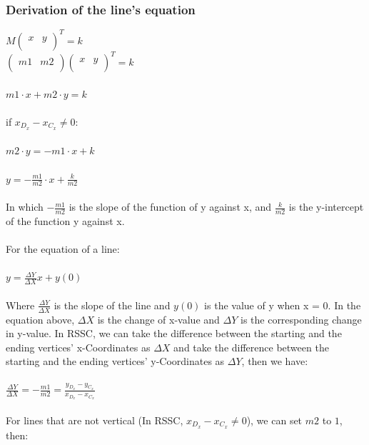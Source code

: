 \documentclass[12pt]{article}
\begin{document}
\subsubsection*{Derivation of the line's equation}
$M \begin{pmatrix}
  x & y \\
\end{pmatrix}^T = k$\\
$\begin{pmatrix}
  m1 & m2 \\
\end{pmatrix}
\begin{pmatrix}
  x & y \\
\end{pmatrix}^T = k$\\
\\
$m1 \cdot x + m2 \cdot y = k$\\
\\
if $ x_{D_x}-x_{C_x}\neq{0}$: \\
\\
\indent
$m2\cdot y = -m1\cdot x + k$\\
\\
\indent
$y = -\frac{m1}{m2}\cdot x + \frac{k}{m2}$\\
\\
In which $-\frac{m1}{m2}$ is the slope of the function of y against x, and $\frac{k}{m2}$ 
is the y-intercept of the function y against x.\\
\\
For the equation of a line:\\
\\
\indent
$y = \frac{\Delta Y}{\Delta X} x + y(0)$\\ 
\\
Where $\frac{\Delta Y}{\Delta X}$ is the slope of the line and $y(0)$ is the value of y
when x = 0. In the equation above, $\Delta X$ is the change of x-value and $\Delta Y$ 
is the corresponding change in y-value. In RSSC, we can take the difference between the starting and the ending vertices' x-Coordinates as $\Delta X$ and take the difference between the starting and the ending vertices' y-Coordinates as $\Delta Y$, then we 
have:\\
\\
\indent
$\frac{\Delta Y}{\Delta X} = -\frac{m1}{m2} = \frac{y_{D_x}-y_{C_x}}{x_{D_x}-x_{C_x}}$\\
\\
For lines that are not vertical (In RSSC, $ x_{D_x}-x_{C_x} \neq 0$), we can set $m2$ 
to $1$, then:\\
\end{document}

